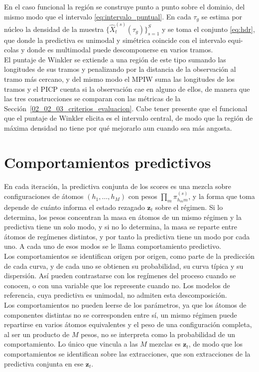 En el caso funcional la región se construye punto a punto sobre el dominio, del mismo modo que el intervalo \eqref{eq:intervalo_puntual}. En cada $\tau_g$ se estima por núcleo la densidad de la muestra $\{\widehat{X}_t^{(s)}(\tau_g)\}_{s=1}^{S}$ y se toma el conjunto \eqref{eq:hdr}, que donde la predictiva es unimodal y simétrica coincide con el intervalo equi-colas y donde es multimodal puede descomponerse en varios tramos.\\

El puntaje de Winkler se extiende a una región de este tipo sumando las longitudes de sus tramos y penalizando por la distancia de la observación al tramo más cercano, y del mismo modo el MPIW suma las longitudes de los tramos y el PICP cuenta si la observación cae en alguno de ellos, de manera que las tres construcciones se comparan con las métricas de la Sección~\ref{02_02_03_criterios_evaluacion}. Cabe tener presente que el funcional que el puntaje de Winkler elicita es el intervalo central, de modo que la región de máxima densidad no tiene por qué mejorarlo aun cuando sea más angosta.

\section{Comportamientos predictivos}
\label{03_06_00_comportamientos}
En cada iteración, la predictiva conjunta de los scores es una mezcla sobre configuraciones de átomos $(h_1, \dots, h_M)$ con pesos $\prod_m \pi_{h_m m}^{(s)}$, y la forma que toma depende de cuánto informa el estado rezagado $\mathbf{z}_t$ sobre el régimen. Si lo determina, los pesos concentran la masa en átomos de un mismo régimen y la predictiva tiene un solo modo, y si no lo determina, la masa se reparte entre átomos de regímenes distintos, y por tanto la predictiva tiene un modo por cada uno. A cada uno de esos modos se le llama comportamiento predictivo.\\

Los comportamientos se identifican origen por origen, como parte de la predicción de cada curva, y de cada uno se obtienen su probabilidad, su curva típica y su dispersión. Así pueden contrastarse con los regímenes del proceso cuando se conocen, o con una variable que los represente cuando no. Los modelos de referencia, cuya predictiva es unimodal, no admiten esta descomposición.\\

Los comportamientos no pueden leerse de los parámetros, ya que los átomos de componentes distintas no se corresponden entre sí, un mismo régimen puede repartirse en varios átomos equivalentes y el peso de una configuración completa, al ser un producto de $M$ pesos, no se interpreta como la probabilidad de un comportamiento. Lo único que vincula a las $M$ mezclas es $\mathbf{z}_t$, de modo que los comportamientos se identifican sobre las extracciones, que son extracciones de la predictiva conjunta en ese $\mathbf{z}_t$. 
 
